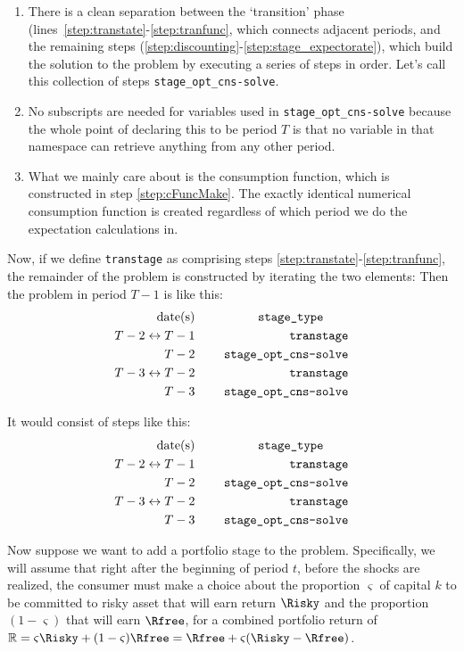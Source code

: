 \documentclass[\econtexRoot/BufferStockTheory]{subfiles}
\begin{document}
\begin{enumerate}
\item There is a clean separation between the `transition' phase (lines~\ref{step:transtate}-\ref{step:tranfunc}, which connects adjacent periods, and the remaining steps (\ref{step:discounting}-\ref{step:stage_expectorate}), which build the solution to the problem by executing a series of steps in order.  Let's call this collection of steps \texttt{stage\_opt\_cns-solve}.
\item No subscripts are needed for variables used in \texttt{stage\_opt\_cns-solve} because the whole point of declaring this to be period $T$ is that no variable in that namespace can retrieve anything from any other period.
  \item What we mainly care about is the consumption function, which is constructed in step \ref{step:cFuncMake}.  The exactly identical numerical consumption function is created regardless of which period we do the expectation calculations in.
  \end{enumerate}


  Now, if we define \texttt{transtage} as comprising steps \ref{step:transtate}-\ref{step:tranfunc}, the remainder of the problem is constructed by iterating the two elements:
Then the problem in period $T-1$ is like this:
\begin{alignat}{3}
\text{date(s)}              &      &   \notag       \qquad \texttt{stage\_type} \qquad
\\ T-2\leftrightarrow T-1 & ~~~~ & \text{\texttt{transtage}}
\\ T-2 & ~~~~ & \text{\texttt{stage\_opt\_cns-solve}}
\\ T-3\leftrightarrow T-2 & ~~~~ & \text{\texttt{transtage}}
\\ T-3 & ~~~~ & \text{\texttt{stage\_opt\_cns-solve}}
\end{alignat}

It would consist of steps like this:
\begin{alignat}{3}
\text{date(s)}              &      &   \notag       \qquad \texttt{stage\_type} \qquad
\\ T-2\leftrightarrow T-1 & ~~~~ & \text{\texttt{transtage}}
\\ T-2 & ~~~~ & \text{\texttt{stage\_opt\_cns-solve}}
\\ T-3\leftrightarrow T-2 & ~~~~ & \text{\texttt{transtage}}
\\ T-3 & ~~~~ & \text{\texttt{stage\_opt\_cns-solve}}
\end{alignat}

Now suppose we want to add a portfolio stage to the problem.  Specifically, we will assume that right after the beginning of period $t$, before the shocks are realized, the consumer must make a choice about the proportion $\varsigma$ of capital $k$ to be committed to risky asset that will earn return $\Risky$ and the proportion $(1-\varsigma)$ that will earn $\Rfree$, for a combined portfolio return of $\mathbb{R}=\varsigma \Risky + (1-\varsigma)\Rfree = \Rfree+\varsigma(\Risky-\Rfree)$.
\end{document}

